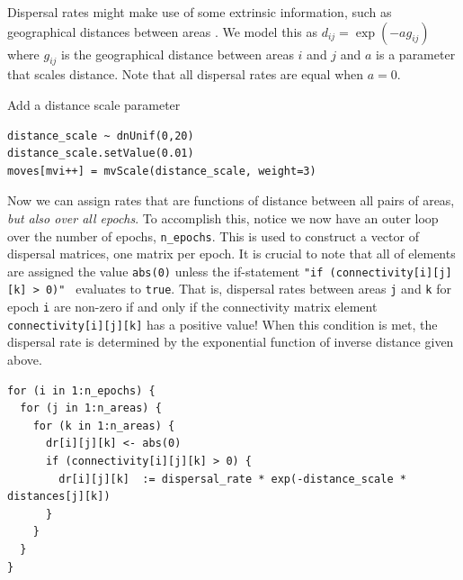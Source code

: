 Dispersal rates might make use of some extrinsic information, such as geographical distances between areas \citep{MacArthur1967, Webb2012}.
We model this as $d_{ij} = \exp(-a g_{ij})$ where $g_{ij}$ is the geographical distance between areas $i$ and $j$ and $a$ is a parameter that scales distance.
Note that all dispersal rates are equal when $a=0$.

Add a distance scale parameter

\begin{snugshade}
\begin{lstlisting}
distance_scale ~ dnUnif(0,20)
distance_scale.setValue(0.01)
moves[mvi++] = mvScale(distance_scale, weight=3)
\end{lstlisting}
\end{snugshade}

Now we can assign rates that are functions of distance between all pairs of areas, {\it but also over all epochs}.
To accomplish this, notice we now have an outer loop over the number of epochs, {\tt n\_epochs}.
This is used to construct a vector of dispersal matrices, one matrix per epoch.
It is crucial to note that all of elements are assigned the value {\tt abs(0)} unless the if-statement {\tt "if (connectivity[i][j][k] > 0)" } evaluates to {\tt true}.
That is, dispersal rates between areas {\tt j} and {\tt k} for epoch {\tt i} are non-zero if and only if the connectivity matrix element {\tt connectivity[i][j][k]} has a positive value!
When this condition is met, the dispersal rate is determined by the exponential function of inverse distance given above.


\begin{snugshade}
\begin{lstlisting}
for (i in 1:n_epochs) {
  for (j in 1:n_areas) {
    for (k in 1:n_areas) {
      dr[i][j][k] <- abs(0)
      if (connectivity[i][j][k] > 0) {
        dr[i][j][k]  := dispersal_rate * exp(-distance_scale * distances[j][k])
      }
    }
  }
}
\end{lstlisting}
\end{snugshade}




